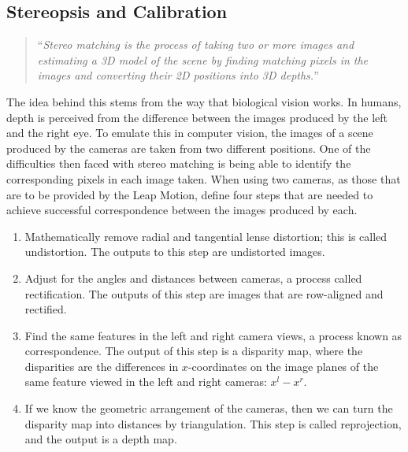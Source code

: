 \documentclass[11pt,oneside]{report}
\begin{document}
			\subsection{Stereopsis and Calibration}
			\begin{quote}
				``\textit{Stereo matching is the process of taking two or more images and estimating a 3D model of the scene by finding matching pixels in the images and converting their 2D positions into 3D depths.}''\cite{book:sam}
			\end{quote}
			The idea behind this stems from the way that biological vision works.
			In humans, depth is perceived from the difference between the images produced by the left and the right eye.
			To emulate this in computer vision, the images of a scene produced by the cameras are taken from two different positions.
			One of the difficulties then faced with stereo matching is being able to identify the corresponding pixels in each image taken.
			When using two cameras, as those that are to be provided by the Leap Motion,  define four steps that are needed to achieve successful correspondence between the images produced by each.
			
			\begin{enumerate}
				\item Mathematically remove radial and tangential lense distortion; this is called undistortion. The outputs to this step are undistorted images.
				
				\item Adjust for the angles and distances between cameras, a process called rectification. The outputs of this step are images that are row-aligned and rectified.
				
				\item Find the same features in the left and right camera views, a process known as correspondence. The output of this step is a disparity map, where the disparities are the differences in $x$-coordinates on the image planes of the same feature viewed in the left and right cameras: $x^{l} - x^{r}$.
				
				\item If we know the geometric arrangement of the cameras, then we can turn the disparity map into distances by triangulation. This step is called reprojection, and the output is a depth map.
			\end{enumerate}
			
\end{document}
